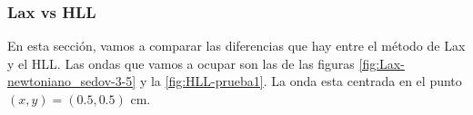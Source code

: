 \documentclass[12pt,a4paper]{book}
\begin{document}
\subsubsection{Lax vs HLL}

En esta sección, vamos a comparar las diferencias que hay entre el método de Lax y el HLL. Las ondas que vamos a ocupar son las de las figuras \ref{fig:Lax-newtoniano_sedov-3-5} y la \ref{fig:HLL-prueba1}. La onda esta centrada en el punto $(x,y)=(0.5,0.5)$ cm.



\end{document}
